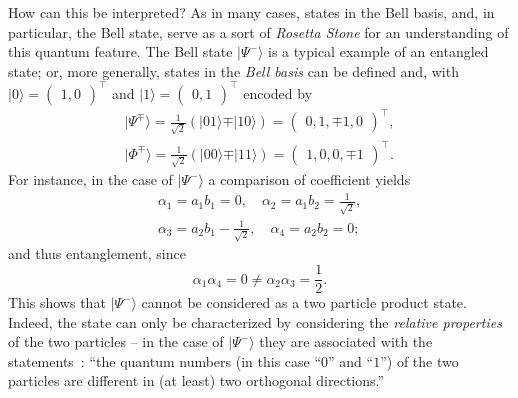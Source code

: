 \documentclass[%
  twocolumn,
 showpacs,
 showkeys,
 preprintnumbers,
 amsmath,amssymb,
 aps,
  pra,
  longbibliography,
 floatfix,
 ]{revtex4-1}
\begin{document}
How can this be interpreted?
As in many cases, states in the Bell basis, and, in particular, the Bell state,
serve as a sort of
{\em Rosetta Stone}
for an understanding of this quantum feature.
The  Bell state
$\vert \Psi^- \rangle$ is a typical example of an entangled state;
or, more generally, states in the
{\em Bell basis}
 can be defined and,
with
$\vert  0 \rangle =  \begin{pmatrix}1,0\end{pmatrix}^\intercal$
and
$\vert  1 \rangle =  \begin{pmatrix}0,1\end{pmatrix}^\intercal$
  encoded by
\begin{equation}
\begin{split}
\vert \Psi^\mp \rangle = \frac{1}{\sqrt{2}}\left(\vert 0   1 \rangle \mp \vert 1   0 \rangle  \right)= \begin{pmatrix} 0, 1, \mp 1, 0\end{pmatrix}^\intercal ,  \\
\vert \Phi^\mp \rangle = \frac{1}{\sqrt{2}}\left(\vert 0   0 \rangle \mp \vert 1   1 \rangle  \right)= \begin{pmatrix} 1, 0, 0, \mp 1\end{pmatrix}^\intercal  .
\end{split}
\label{2014-m-ch-fdvs-bellbasis2}
\end{equation}
For instance, in the case of $\vert \Psi^- \rangle$ a comparison of coefficient yields
\begin{equation}
\begin{split}
\alpha_1=a_1b_1=0, \quad
\alpha_2=a_1b_2=\frac{1}{\sqrt{2}},\\
\alpha_3=a_2b_1-\frac{1}{\sqrt{2}}, \quad
\alpha_4=a_2b_2=0;
\end{split}
\label{2012-m-ch-fdvs-BellSCC}
\end{equation}
and thus
entanglement, since
\begin{equation}
{\alpha_1}{\alpha_4}=0 \neq {\alpha_2}{\alpha_3}=\frac{1}{2}.
\end{equation}
This shows that  $\vert \Psi^- \rangle$ cannot be considered as a two particle product state.
Indeed, the state can only be characterized by considering the {\em relative properties}
of the two particles --
in the case of  $\vert \Psi^- \rangle$ they are associated with the statements~\cite{zeil-99}:
``the quantum numbers (in this case ``$0$'' and ``$1$'') of the two particles are different in (at least) two orthogonal directions.''
\end{document}
